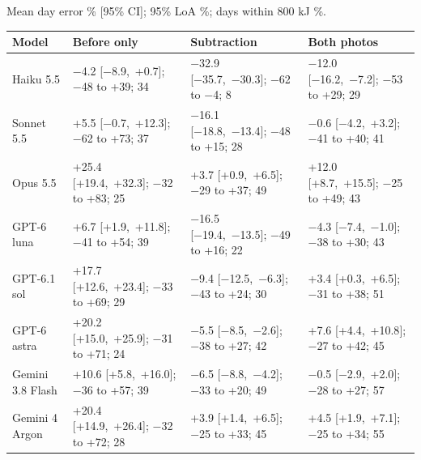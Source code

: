 \documentclass[
  11pt,
  letterpaper]{article}
\newcounter{none} %
\begin{document}
Mean day error \% {[}95\% CI{]}; 95\% LoA \%; days within 800 kJ \%.

{\def\LTcaptype{none} %
\begin{longtable}[]{@{}
  >{\raggedright\arraybackslash}p{}
  >{\raggedright\arraybackslash}p{}
  >{\raggedright\arraybackslash}p{}
  >{\raggedright\arraybackslash}p{}@{}}
\toprule\noalign{}
\begin{minipage}[b]{\linewidth}\raggedright
Model
\end{minipage} & \begin{minipage}[b]{\linewidth}\raggedright
Before only
\end{minipage} & \begin{minipage}[b]{\linewidth}\raggedright
Subtraction
\end{minipage} & \begin{minipage}[b]{\linewidth}\raggedright
Both photos
\end{minipage} \\
\midrule\noalign{}
\endhead
\bottomrule\noalign{}
\endlastfoot
Haiku 5.5 & −4.2 {[}−8.9,~+0.7{]}; −48 to +39; 34 & −32.9 {[}−35.7,~−30.3{]}; −62 to −4; 8 & −12.0
{[}−16.2,~−7.2{]}; −53 to +29; 29 \\
Sonnet 5.5 & +5.5 {[}−0.7,~+12.3{]}; −62 to +73; 37 & −16.1 {[}−18.8,~−13.4{]}; −48 to +15; 28 & −0.6
{[}−4.2,~+3.2{]}; −41 to +40; 41 \\
Opus 5.5 & +25.4 {[}+19.4,~+32.3{]}; −32 to +83; 25 & +3.7 {[}+0.9,~+6.5{]}; −29 to +37; 49 & +12.0
{[}+8.7,~+15.5{]}; −25 to +49; 43 \\
GPT-6 luna & +6.7 {[}+1.9,~+11.8{]}; −41 to +54; 39 & −16.5 {[}−19.4,~−13.5{]}; −49 to +16; 22 & −4.3
{[}−7.4,~−1.0{]}; −38 to +30; 43 \\
GPT-6.1 sol & +17.7 {[}+12.6,~+23.4{]}; −33 to +69; 29 & −9.4 {[}−12.5,~−6.3{]}; −43 to +24; 30 & +3.4
{[}+0.3,~+6.5{]}; −31 to +38; 51 \\
GPT-6 astra & +20.2 {[}+15.0,~+25.9{]}; −31 to +71; 24 & −5.5 {[}−8.5,~−2.6{]}; −38 to +27; 42 & +7.6
{[}+4.4,~+10.8{]}; −27 to +42; 45 \\
Gemini 3.8 Flash & +10.6 {[}+5.8,~+16.0{]}; −36 to +57; 39 & −6.5 {[}−8.8,~−4.2{]}; −33 to +20; 49 & −0.5
{[}−2.9,~+2.0{]}; −28 to +27; 57 \\
Gemini 4 Argon & +20.4 {[}+14.9,~+26.4{]}; −32 to +72; 28 & +3.9 {[}+1.4,~+6.5{]}; −25 to +33; 45 & +4.5
{[}+1.9,~+7.1{]}; −25 to +34; 55 \\
\end{longtable}
}
\end{document}
